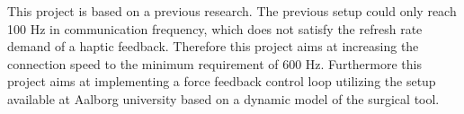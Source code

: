 This project is based on a previous research. The previous setup could only reach 100 Hz in communication frequency\cite{Chris_Surgical}, which does not satisfy the refresh rate demand of a haptic feedback. Therefore this project aims at increasing the connection speed to the minimum
requirement of 600 Hz.
Furthermore this project aims at implementing a force feedback control loop utilizing the
setup available at Aalborg university based on a dynamic model of the surgical tool.










